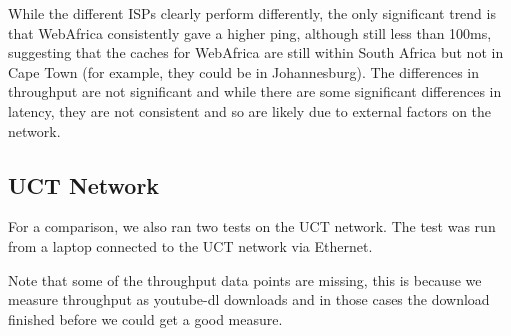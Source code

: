 \documentclass{sig-alternate-05-2015}
\begin{document}
\begin{table}
	\centering
	\caption{Offset from median throughput (KB/s, higher is better)}
	\label{table:OffsetFromMedianThroughput}
\end{table}
While the different ISPs clearly perform differently, the only significant trend is that WebAfrica consistently gave a higher ping, although still less than 100ms, suggesting that the caches for WebAfrica are still within South Africa but not in Cape Town (for example, they could be in Johannesburg). 
The differences in throughput are not significant and while there are some significant differences in latency, they are not consistent and so are likely due to external factors on the network.

\subsection{UCT Network}
For a comparison, we also ran two tests on the UCT network. The test was run from a laptop connected to the UCT network via Ethernet.

Note that some of the throughput data points are missing, this is because we measure throughput as youtube-dl downloads and in those cases the download finished before we could get a good measure.
\end{document}
